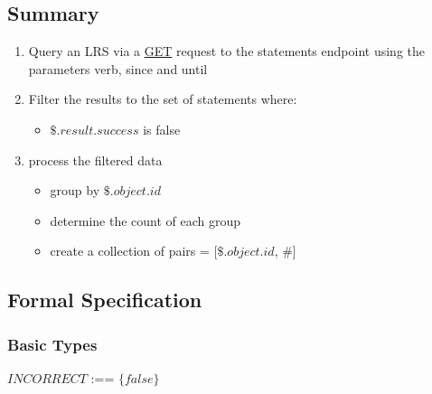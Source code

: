 \documentclass{article}
\begin{document}
\subsection{Summary}

\begin{enumerate}
\item Query an LRS via a \href{https://github.com/adlnet/xAPI-Spec/blob/master/xAPI-Communication.md#213-get-statements}{GET} request to the statements endpoint using the parameters verb, since and until
\item Filter the results to the set of statements where:
  \begin{itemize}
  \item $\$.result.success$ is false
  \end{itemize}
\item process the filtered data
  \begin{itemize}
  \item group by $\$.object.id$
  \item determine the count of each group
  \item create a collection of pairs = [$\$.object.id$, \#]
  \end{itemize}
\end{enumerate}

\subsection{Formal Specification}
\subsubsection{Basic Types}

$INCORRECT$ :== $\{false\}$
\end{document}
